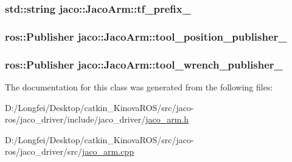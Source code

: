 \subsubsection[{\texorpdfstring{tf\+\_\+prefix\+\_\+}{tf_prefix_}}]{\setlength{\rightskip}{0pt plus 5cm}std\+::string jaco\+::\+Jaco\+Arm\+::tf\+\_\+prefix\+\_\+\hspace{0.3cm}{\ttfamily [private]}}\hypertarget{classjaco_1_1JacoArm_a4f7d75d1cfcf82b4221e6bd6e4412cf9}{}\label{classjaco_1_1JacoArm_a4f7d75d1cfcf82b4221e6bd6e4412cf9}
\subsubsection[{\texorpdfstring{tool\+\_\+position\+\_\+publisher\+\_\+}{tool_position_publisher_}}]{\setlength{\rightskip}{0pt plus 5cm}ros\+::\+Publisher jaco\+::\+Jaco\+Arm\+::tool\+\_\+position\+\_\+publisher\+\_\+\hspace{0.3cm}{\ttfamily [private]}}\hypertarget{classjaco_1_1JacoArm_a9d6b0687a753f44ecdb2e93aeeddd288}{}\label{classjaco_1_1JacoArm_a9d6b0687a753f44ecdb2e93aeeddd288}
\subsubsection[{\texorpdfstring{tool\+\_\+wrench\+\_\+publisher\+\_\+}{tool_wrench_publisher_}}]{\setlength{\rightskip}{0pt plus 5cm}ros\+::\+Publisher jaco\+::\+Jaco\+Arm\+::tool\+\_\+wrench\+\_\+publisher\+\_\+\hspace{0.3cm}{\ttfamily [private]}}\hypertarget{classjaco_1_1JacoArm_abff4dc1bbe63e0be7cd20ac7c4d37be4}{}\label{classjaco_1_1JacoArm_abff4dc1bbe63e0be7cd20ac7c4d37be4}


The documentation for this class was generated from the following files\+:\begin{DoxyCompactItemize}
\item 
D\+:/\+Longfei/\+Desktop/catkin\+\_\+\+Kinova\+R\+O\+S/src/jaco-\/ros/jaco\+\_\+driver/include/jaco\+\_\+driver/\hyperlink{jaco__arm_8h}{jaco\+\_\+arm.\+h}\item 
D\+:/\+Longfei/\+Desktop/catkin\+\_\+\+Kinova\+R\+O\+S/src/jaco-\/ros/jaco\+\_\+driver/src/\hyperlink{jaco__arm_8cpp}{jaco\+\_\+arm.\+cpp}\end{DoxyCompactItemize}
